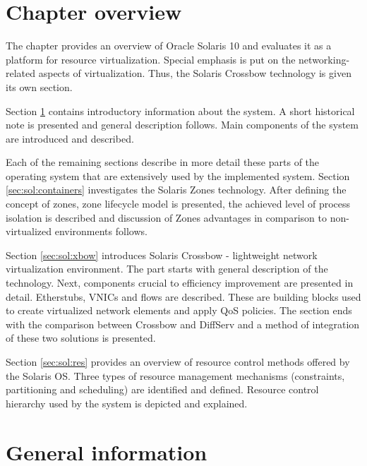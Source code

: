 \documentclass[11pt]{book}
\begin{document}
    \section*{Chapter overview}


      The chapter provides an overview of Oracle Solaris 10 and evaluates it as a platform for resource virtualization.
      Special emphasis is put on the networking-related aspects of virtualization. Thus, the Solaris Crossbow technology
      is given its own section.

      Section \ref{sec:sol:general} contains introductory information about the system. A short historical note is
      presented and general description follows. Main components of the system are introduced and described.
      
      Each of the remaining sections describe in more detail these parts of the operating system that are extensively
      used by the implemented system. Section \ref{sec:sol:containers} investigates the Solaris Zones technology. After
      defining the concept of zones, zone lifecycle model is presented, the achieved level of process isolation is
      described and discussion of Zones advantages in comparison to non-virtualized environments follows.

      Section \ref{sec:sol:xbow} introduces Solaris Crossbow - lightweight network virtualization environment. The part
      starts with general description of the technology. Next, components crucial to efficiency improvement are
      presented in detail. Etherstubs, VNICs and flows are described. These are building blocks used to create
      virtualized network elements and apply QoS policies. The section ends with the comparison between Crossbow and
      DiffServ and a method of integration of these two solutions is presented.

      Section \ref{sec:sol:res} provides an overview of resource control methods offered by the Solaris OS. Three types
      of resource management mechanisms (constraints, partitioning and scheduling) are identified and defined. Resource
      control hierarchy used by the system is depicted and explained.


    \section{General information}
    \label{sec:sol:general}
\end{document}
